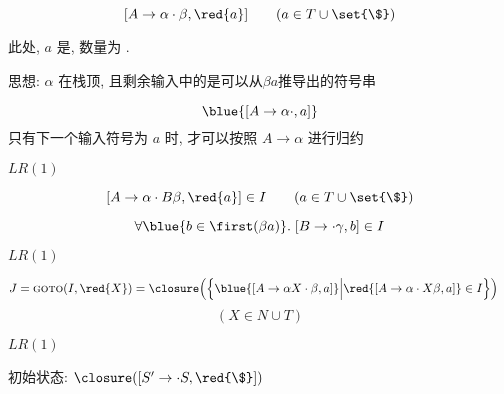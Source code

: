 \begin{frame}{}
  \begin{center}
    \begin{definition}[$LR(1)$项 (Item)]
      \[
        [A \to \alpha \cdot \beta, \red{a}] \qquad (a \in T \cup \set{\$})
      \]

      此处, $a$ 是, 数量为 .
    \end{definition}

    \pause
    \vspace{0.80cm}
    思想: $\alpha$ 在栈顶, 且剩余输入中的是可以从$\beta a$推导出的符号串

    \pause
    \vspace{0.50cm}
    \[
      \blue{[A \to \alpha \cdot, a]}
    \]
    只有下一个输入符号为 $a$ 时, 才可以按照 $A \to \alpha$ 进行归约
  \end{center}
\end{frame}

\begin{frame}{}
  \begin{center}
    $LR(1)$

    \[
      [A \to \alpha \cdot B \beta, \red{a}] \in I \qquad (a \in T \cup \set{\$})
    \]

    \[
      \forall \blue{b \in \first(\beta a)}.\; [B \to \cdot \gamma, b] \in I
    \]
  \end{center}
\end{frame}

\begin{frame}{}
  \begin{center}
    $LR(1)$

    \vspace{0.60cm}
    \begin{align*}
      J = \textsc{goto}(I, \red{X}) &= \closure\Big(\Big\{
            \blue{[A \to \alpha X \cdot \beta, a]}
            \Big\lvert \red{[A \to \alpha \cdot X \beta, a]} \in I \Big\}\Big)
    \end{align*}
    \[
      (X \in N \cup T)
    \]
  \end{center}
\end{frame}

\begin{frame}{}
  \begin{center}
    $LR(1)$

    \vspace{0.60cm}

    \vspace{0.60cm}
    初始状态: $\closure({[S' \to \cdot S, \red{\$}]})$
  \end{center}
\end{frame}

